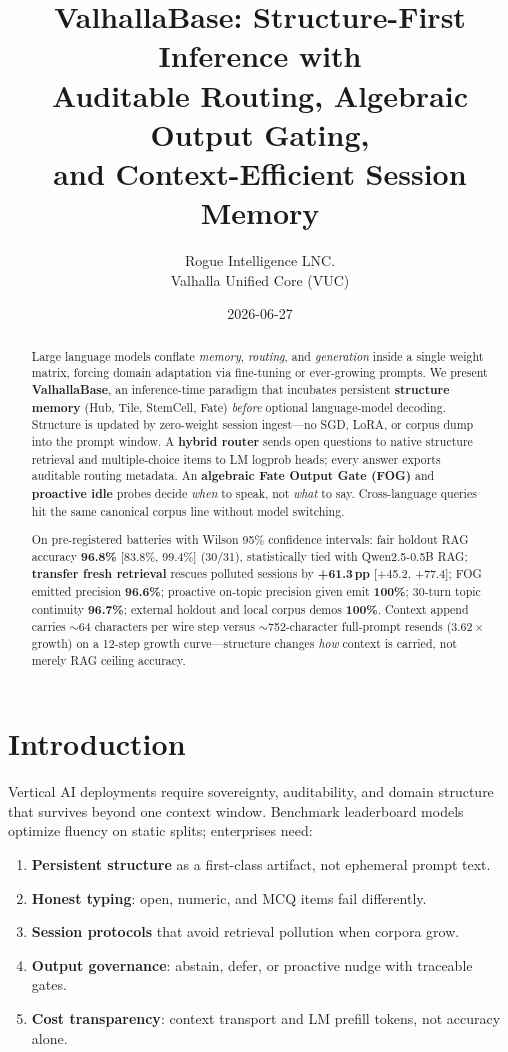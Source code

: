 \documentclass[11pt,a4paper]{article}
\title{ValhallaBase: Structure-First Inference with\\Auditable Routing, Algebraic Output Gating,\\and Context-Efficient Session Memory}
\author{Rogue Intelligence LNC.\\Valhalla Unified Core (VUC)}
\date{2026-06-27}
\begin{document}
\maketitle

\begin{abstract}
Large language models conflate \emph{memory}, \emph{routing}, and \emph{generation} inside a single weight matrix, forcing domain adaptation via fine-tuning or ever-growing prompts. We present \textbf{ValhallaBase}, an inference-time paradigm that incubates persistent \textbf{structure memory} (Hub, Tile, StemCell, Fate) \emph{before} optional language-model decoding. Structure is updated by zero-weight session ingest---no SGD, LoRA, or corpus dump into the prompt window. A \textbf{hybrid router} sends open questions to native structure retrieval and multiple-choice items to LM logprob heads; every answer exports auditable routing metadata. An \textbf{algebraic Fate Output Gate (FOG)} and \textbf{proactive idle} probes decide \emph{when} to speak, not \emph{what} to say. Cross-language queries hit the same canonical corpus line without model switching.

On pre-registered batteries with Wilson 95\% confidence intervals: fair holdout RAG accuracy \textbf{96.8\%} [83.8\%, 99.4\%] (30/31), statistically tied with Qwen2.5-0.5B RAG; \textbf{transfer fresh retrieval} rescues polluted sessions by \textbf{+61.3\,pp} [+45.2, +77.4]; FOG emitted precision \textbf{96.6\%}; proactive on-topic precision given emit \textbf{100\%}; 30-turn topic continuity \textbf{96.7\%}; external holdout and local corpus demos \textbf{100\%}. Context append carries $\sim$64 characters per wire step versus $\sim$752-character full-prompt resends ($3.62\times$ growth) on a 12-step growth curve---structure changes \emph{how} context is carried, not merely RAG ceiling accuracy.
\end{abstract}

\section{Introduction}

Vertical AI deployments require sovereignty, auditability, and domain structure that survives beyond one context window. Benchmark leaderboard models optimize fluency on static splits; enterprises need:

\begin{enumerate}
  \item \textbf{Persistent structure} as a first-class artifact, not ephemeral prompt text.
  \item \textbf{Honest typing}: open, numeric, and MCQ items fail differently.
  \item \textbf{Session protocols} that avoid retrieval pollution when corpora grow.
  \item \textbf{Output governance}: abstain, defer, or proactive nudge with traceable gates.
  \item \textbf{Cost transparency}: context transport and LM prefill tokens, not accuracy alone.
\end{enumerate}
\end{document}
